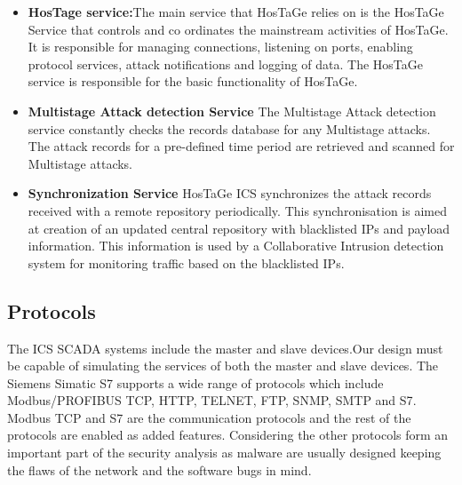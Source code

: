 \documentclass[article,msc=informatik,type=msc,colorback,accentcolor=tud9c]{tudthesis}
\begin{document}
       \begin{itemize}
       
       
       \item\textbf{HosTage service:}The main service that HosTaGe relies on is the HosTaGe Service that controls and co ordinates the mainstream activities of HosTaGe. It is responsible for managing connections, listening on ports, enabling protocol services, attack notifications and logging of data. The HosTaGe service is responsible for the basic functionality of HosTaGe. 
       
       
       
       \item\textbf{Multistage Attack detection Service} The Multistage Attack detection service constantly checks the records database for any Multistage attacks. The attack records for a pre-defined time period are retrieved and scanned for Multistage attacks.
       
       
       \item\textbf{Synchronization Service} HosTaGe ICS synchronizes the attack records received with a remote repository periodically. This synchronisation is aimed at creation of an updated central repository with blacklisted \ac{IP}s and payload information. This information is used by a Collaborative Intrusion detection  system for monitoring traffic based on the blacklisted \ac{IP}s.  
       
       
       \end{itemize}
       
       
    \vspace{5mm}     
  
 	\subsection{Protocols}\label{Protocols}
	
	
	\vspace{3mm}
	The \ac{ICS} \ac{SCADA} systems include the master and slave devices.Our design must be capable of simulating the services of both the master and slave devices. The Siemens Simatic S7 supports a wide range of protocols which include Modbus/PROFIBUS \ac{TCP}, \ac{HTTP}, TELNET, \ac{FTP}, \ac{SNMP}, \ac{SMTP} and \ac{S7}. Modbus \ac{TCP} and \ac{S7} are the communication protocols and the rest of the protocols are enabled as added features.  Considering the other protocols form an important part of the security analysis as malware are usually designed keeping the flaws of the network and the software bugs in mind.
\end{document}
